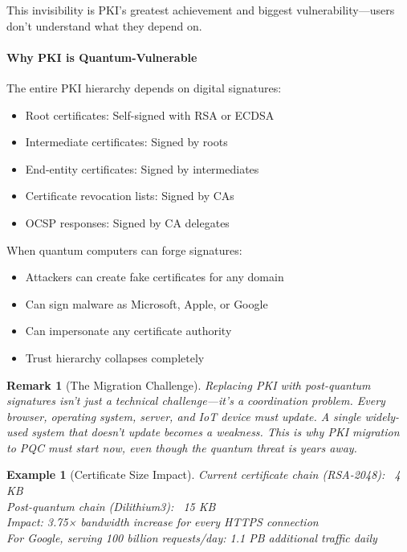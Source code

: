\documentclass[11pt,a4paper]{article}
\newtheorem{example}{Example}
\newtheorem{remark}{Remark}
\begin{document}
This invisibility is PKI's greatest achievement and biggest vulnerability---users don't understand what they depend on.

\paragraph{Why PKI is Quantum-Vulnerable}

The entire PKI hierarchy depends on digital signatures:
\begin{itemize}
    \item Root certificates: Self-signed with RSA or ECDSA
    \item Intermediate certificates: Signed by roots
    \item End-entity certificates: Signed by intermediates
    \item Certificate revocation lists: Signed by CAs
    \item OCSP responses: Signed by CA delegates
\end{itemize}

When quantum computers can forge signatures:
\begin{itemize}
    \item Attackers can create fake certificates for any domain
    \item Can sign malware as Microsoft, Apple, or Google
    \item Can impersonate any certificate authority
    \item Trust hierarchy collapses completely
\end{itemize}

\begin{remark}[The Migration Challenge]
Replacing PKI with post-quantum signatures isn't just a technical challenge---it's a coordination problem. Every browser, operating system, server, and IoT device must update. A single widely-used system that doesn't update becomes a weakness. This is why PKI migration to PQC must start now, even though the quantum threat is years away.
\end{remark}

\begin{example}[Certificate Size Impact]
Current certificate chain (RSA-2048): ~4 KB\\
Post-quantum chain (Dilithium3): ~15 KB\\
Impact: 3.75× bandwidth increase for every HTTPS connection\\
For Google, serving 100 billion requests/day: 1.1 PB additional traffic daily
\end{example}
\end{document}

